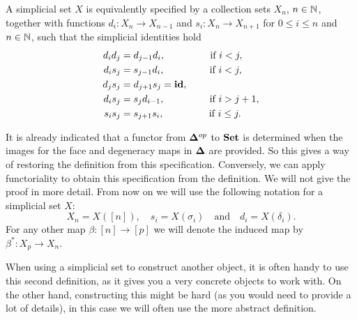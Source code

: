 \begin{lemma}
	A simplicial set $X$ is equivalently specified by a collection sets $X_n$, $n \in \mathbb{N}$, together with functions $d_i: X_n \to X_{n-1}$ and $s_i: X_n \to X_{n+1}$ for $0 \leq i \leq n$ and $n \in \mathbb{N}$, such that the simplicial identities hold
	\begin{align}
		d_i d_j &= d_{j-1} d_i,  \hspace{1.5cm} \text{ if } i < j,\\
		d_i s_j &= s_{j-1} d_i,  \hspace{1.5cm} \text{ if } i < j,\\
		d_j s_j &= d_{j+1} s_j = \mathbf{id},\\
		d_i s_j &= s_j d_{i-1},  \hspace{1.5cm} \text{ if } i > j+1,\\
		s_i s_j &= s_{j+1} s_i,  \hspace{1.5cm} \text{ if } i \leq j.
	\end{align}
\end{lemma}

It is already indicated that a functor from $\mathbf{\Delta}^{op}$ to $\mathbf{Set}$ is determined when the images for the face and degeneracy maps in $\mathbf{\Delta}$ are provided. So this gives a way of restoring the definition from this specification. Conversely, we can apply functoriality to obtain this specification from the definition. We will not give the proof in more detail. From now on we will use the following notation for a simplicial set $X$:
$$ X_n = X([n]), \quad s_i = X(\sigma_i) \quad\text{and}\quad d_i = X(\delta_i). $$
For any other map $\beta : [n] \to [p]$ we will denote the induced map by $\beta^\ast: X_p \to X_n$.

When using a simplicial set to construct another object, it is often handy to use this second definition, as it gives you a very concrete objects to work with. On the other hand, constructing this might be hard (as you would need to provide a lot of details), in this case we will often use the more abstract definition.


